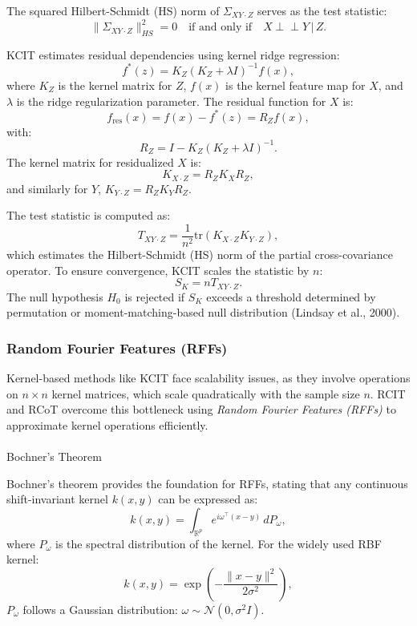 \documentclass[
]{article}
\makeatletter
\let\oldparagraph\paragraph
\renewcommand{\paragraph}{
    \@ifstar
      \xxxParagraphStar
      \xxxParagraphNoStar
  }
\newcommand{\xxxParagraphStar}[1]{\oldparagraph*{#1}\mbox{}}
\newcommand{\xxxParagraphNoStar}[1]{\oldparagraph{#1}\mbox{}}
\makeatother
\begin{document}
The squared Hilbert-Schmidt (HS) norm of \(\Sigma_{XY \cdot Z}\) serves
as the test statistic: \[
\|\Sigma_{XY \cdot Z}\|^2_{HS} = 0 \quad \text{if and only if} \quad X \perp\!\!\!\perp Y \,|\, Z.
\]

KCIT estimates residual dependencies using kernel ridge regression: \[
f^*(z) = K_Z (K_Z + \lambda I)^{-1} f(x),
\] where \(K_Z\) is the kernel matrix for \(Z\), \(f(x)\) is the kernel
feature map for \(X\), and \(\lambda\) is the ridge regularization
parameter. The residual function for \(X\) is: \[
f_\text{res}(x) = f(x) - f^*(z) = R_Z f(x),
\] with: \[
R_Z = I - K_Z (K_Z + \lambda I)^{-1}.
\] The kernel matrix for residualized \(X\) is: \[
K_{X \cdot Z} = R_Z K_X R_Z,
\] and similarly for \(Y\), \(K_{Y \cdot Z} = R_Z K_Y R_Z\).

The test statistic is computed as: \[
T_{XY \cdot Z} = \frac{1}{n^2} \text{tr}(K_{X \cdot Z} K_{Y \cdot Z}),
\] which estimates the Hilbert-Schmidt (HS) norm of the partial
cross-covariance operator. To ensure convergence, KCIT scales the
statistic by \(n\): \[
S_K = n T_{XY \cdot Z}.
\] The null hypothesis \(H_0\) is rejected if \(S_K\) exceeds a
threshold determined by permutation or moment-matching-based null
distribution (Lindsay et al., 2000).

\subsubsection{Random Fourier Features
(RFFs)}\label{random-fourier-features-rffs}

Kernel-based methods like KCIT face scalability issues, as they involve
operations on \(n \times n\) kernel matrices, which scale quadratically
with the sample size \(n\). RCIT and RCoT overcome this bottleneck using
\emph{Random Fourier Features (RFFs)} to approximate kernel operations
efficiently.

\paragraph{Bochner's Theorem}\label{bochners-theorem}

Bochner's theorem provides the foundation for RFFs, stating that any
continuous shift-invariant kernel \(k(x, y)\) can be expressed as: \[
k(x, y) = \int_{\mathbb{R}^p} e^{i \omega^\top (x - y)} \, dP_\omega,
\] where \(P_\omega\) is the spectral distribution of the kernel. For
the widely used RBF kernel: \[
k(x, y) = \exp\left(-\frac{\|x - y\|^2}{2\sigma^2}\right),
\] \(P_\omega\) follows a Gaussian distribution:
\(\omega \sim \mathcal{N}(0, \sigma^2 I)\).
\end{document}
